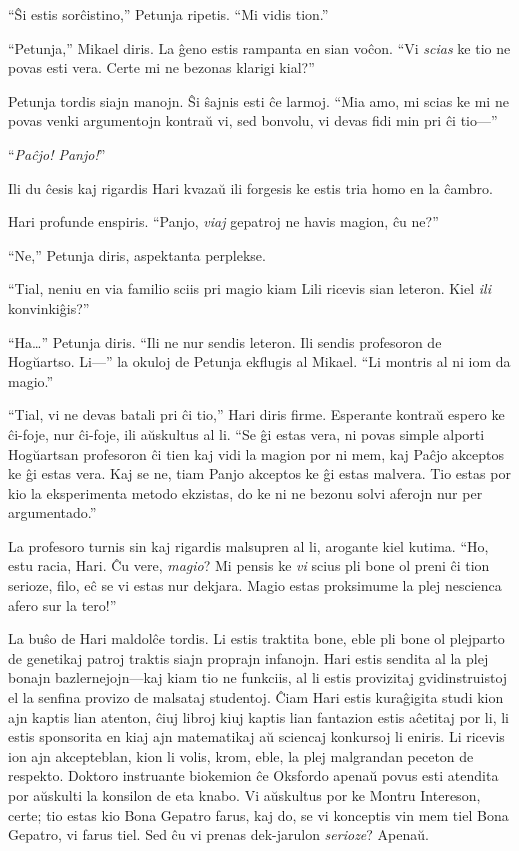 “Ŝi estis sorĉistino,” Petunja ripetis.
“Mi vidis tion.”

“Petunja,” Mikael diris.
La ĝeno estis rampanta en sian voĉon.
“Vi \emph{scias} ke tio ne povas esti vera.
Certe mi ne bezonas klarigi kial?”

Petunja tordis siajn manojn.
Ŝi ŝajnis esti ĉe larmoj.
“Mia amo, mi scias ke mi ne povas venki argumentojn kontraŭ vi, sed bonvolu, vi devas fidi min pri ĉi tio—”

“\emph{Paĉjo! Panjo!}”

Ili du ĉesis kaj rigardis Hari kvazaŭ ili forgesis ke estis tria homo en la ĉambro.

Hari profunde enspiris.
“Panjo, \emph{viaj} gepatroj ne havis magion, ĉu ne?”

“Ne,” Petunja diris, aspektanta perplekse.

“Tial, neniu en via familio sciis pri magio kiam Lili ricevis sian leteron.
Kiel \emph{ili} konvinkiĝis?”

“Ha…” Petunja diris.
“Ili ne nur sendis leteron.
Ili sendis profesoron de Hogŭartso.
Li—” la okuloj de Petunja ekflugis al Mikael.
“Li montris al ni iom da magio.”

“Tial, vi ne devas batali pri ĉi tio,” Hari diris firme.
Esperante kontraŭ espero ke ĉi-foje, nur ĉi-foje, ili aŭskultus al li.
“Se ĝi estas vera, ni povas simple alporti Hogŭartsan profesoron ĉi tien kaj vidi la magion por ni mem, kaj Paĉjo akceptos ke ĝi estas vera.
Kaj se ne, tiam Panjo akceptos ke ĝi estas malvera.
Tio estas por kio la eksperimenta metodo ekzistas, do ke ni ne bezonu solvi aferojn nur per argumentado.”

La profesoro turnis sin kaj rigardis malsupren al li, arogante kiel kutima.
“Ho, estu racia, Hari.
Ĉu vere, \emph{magio}?
Mi pensis ke \emph{vi} scius pli bone ol preni ĉi tion serioze, filo, eĉ se vi estas nur dekjara.
Magio estas proksimume la plej nescienca afero sur la tero!”

La buŝo de Hari maldolĉe tordis.
Li estis traktita bone, eble pli bone ol plejparto de genetikaj patroj traktis siajn proprajn infanojn.
Hari estis sendita al la plej bonajn bazlernejojn—kaj kiam tio ne funkciis, al li estis provizitaj gvidinstruistoj el la senfina provizo de malsataj studentoj.
Ĉiam Hari estis kuraĝigita studi kion ajn kaptis lian atenton, ĉiuj libroj kiuj kaptis lian fantazion estis aĉetitaj por li, li estis sponsorita en kiaj ajn matematikaj aŭ sciencaj konkursoj li eniris.
Li ricevis ion ajn akcepteblan, kion li volis, krom, eble, la plej malgrandan peceton de respekto.
Doktoro instruante biokemion ĉe Oksfordo apenaŭ povus esti atendita por aŭskulti la konsilon de eta knabo.
Vi aŭskultus por ke Montru Intereson, certe; tio estas kio Bona Gepatro farus, kaj do, se vi konceptis vin mem tiel Bona Gepatro, vi farus tiel.
Sed ĉu vi prenas dek-jarulon \emph{serioze}?
Apenaŭ.

